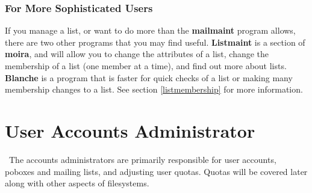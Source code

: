 \documentclass{book}
\begin{document}
\subsection{For More Sophisticated Users}

If you manage a list, or want to do more than the {\bf mailmaint}
program allows, there are two other programs that you may find useful.
 {\bf Listmaint} is a section of {\bf moira}, and will
allow you to change the attributes of a list, change the membership of
a list (one member at a time), and find out more about lists.
 {\bf Blanche} is a program that is faster for quick
checks of a list or making many membership changes to a list.  See
section \ref{listmembership} for more information.

\chapter{User Accounts Administrator}

\athena\ The accounts administrators are primarily responsible for
user accounts, poboxes and mailing lists, and adjusting user quotas.
Quotas will be covered later along with other aspects of filesystems.
\end{document}
